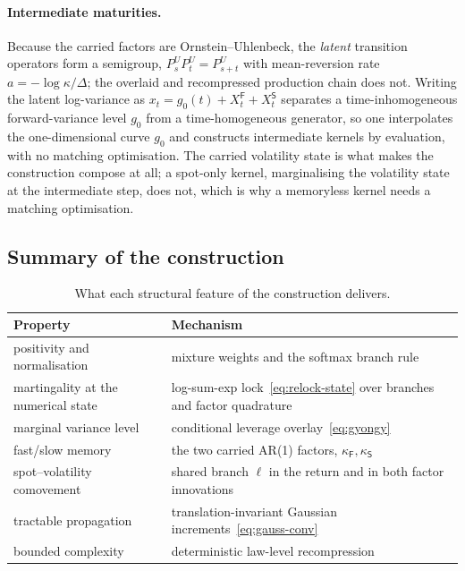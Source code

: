 \documentclass[11pt]{article}
\providecommand{\1}{\mathbf 1}
\begin{document}
\paragraph{Intermediate maturities.} Because the carried factors are Ornstein--Uhlenbeck, the
\emph{latent} transition operators form a semigroup, $P^U_sP^U_t=P^U_{s+t}$ with mean-reversion
rate $a=-\log\kappa/\Delta$; the overlaid and recompressed production chain does not. Writing
the latent log-variance as $x_t=g_0(t)+X^{\mathsf F}_t+X^{\mathsf S}_t$ separates a
time-inhomogeneous forward-variance level $g_0$ from a time-homogeneous generator, so one
interpolates the one-dimensional curve $g_0$ and constructs intermediate kernels by evaluation,
with no matching optimisation. The carried volatility state is what makes
the construction compose at all; a spot-only kernel, marginalising the volatility state at the
intermediate step, does not, which is why a memoryless kernel needs a matching optimisation.

\subsection{Summary of the construction}

\begin{table}[htbp]
\centering\small
\begin{tabular}{p{} p{}}
\toprule
Property & Mechanism \\
\midrule
positivity and normalisation & mixture weights and the softmax branch rule \\[2pt]
martingality at the numerical state & log-sum-exp lock~\eqref{eq:relock-state} over branches and factor quadrature \\[2pt]
marginal variance level & conditional leverage overlay~\eqref{eq:gyongy} \\[2pt]
fast/slow memory & the two carried \textup{AR(1)} factors, $\kappa_{\mathsf F},\kappa_{\mathsf S}$ \\[2pt]
spot--volatility comovement & shared branch $\ell$ in the return and in both factor innovations \\[2pt]
tractable propagation & translation-invariant Gaussian increments~\eqref{eq:gauss-conv} \\[2pt]
bounded complexity & deterministic law-level recompression \\
\bottomrule
\end{tabular}
\caption{What each structural feature of the construction delivers.}
\label{tab:construction}
\end{table}
\end{document}
